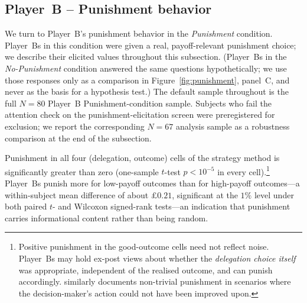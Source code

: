 %

\subsection*{Player~B -- Punishment behavior} \label{sec:result2}

We turn to Player~B's punishment behavior in the \textit{Punishment} condition. Player~Bs in this condition were given a real, payoff-relevant punishment choice; we describe their elicited values throughout this subsection. (Player~Bs in the \textit{No-Punishment} condition answered the same questions hypothetically; we use those responses only as a comparison in Figure~\ref{fig:punishment}, panel~C, and never as the basis for a hypothesis test.) The default sample throughout is the full $N=80$ Player~B Punishment-condition sample. Subjects who fail the attention check on the punishment-elicitation screen were preregistered for exclusion; we report the corresponding $N=67$ analysis sample as a robustness comparison at the end of the subsection.

Punishment in all four (delegation, outcome) cells of the strategy method is significantly greater than zero (one-sample $t$-test $p<10^{-5}$ in every cell).\footnote{Positive punishment in the good-outcome cells need not reflect noise. Player~Bs may hold ex-post views about whether the \textit{delegation choice itself} was appropriate, independent of the realised outcome, and can punish accordingly. \citet{coffman_intermediation_2011} similarly documents non-trivial punishment in scenarios where the decision-maker's action could not have been improved upon.} Player~Bs punish more for low-payoff outcomes than for high-payoff outcomes---a within-subject mean difference of about $\pounds 0.21$, significant at the $1\%$ level under both paired $t$- and Wilcoxon signed-rank tests---an indication that punishment carries informational content rather than being random.

